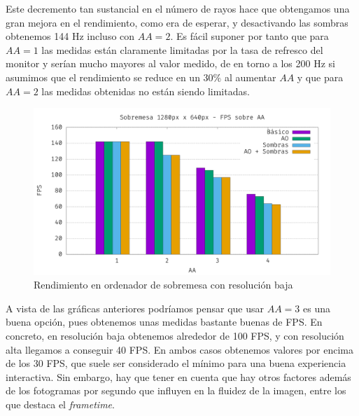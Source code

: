 Este decremento tan sustancial en el número de rayos hace que obtengamos una gran mejora en el rendimiento, como era de esperar, y desactivando las sombras obtenemos 144 Hz incluso con $AA=2$. Es fácil suponer por tanto que para $AA=1$ las medidas están claramente limitadas por la tasa de refresco del monitor y serían mucho mayores al valor medido, de en torno a los 200 Hz si asumimos que el rendimiento se reduce en un $30\%$ al aumentar $AA$ y que para $AA=2$ las medidas obtenidas no están siendo limitadas.\newline
\begin{figure}[ht!]
    \centering
    \includegraphics[width=\textwidth]{Plantilla-TFG-master/img/graficas/SobremesaLR.png}
    \caption{Rendimiento en ordenador de sobremesa con resolución baja}
    \label{fig:sobreLR}
\end{figure}

A vista de las gráficas anteriores podríamos pensar que usar $AA=3$ es una buena opción, pues obtenemos unas medidas bastante buenas de FPS. En concreto, en resolución baja obtenemos alrededor de 100 FPS, y con resolución alta llegamos a conseguir 40 FPS. En ambos casos obtenemos valores por encima de los 30 FPS, que suele ser considerado el mínimo para una buena experiencia interactiva. Sin embargo, hay que tener en cuenta que hay otros factores además de los fotogramas por segundo que influyen en la fluidez de la imagen, entre los que destaca el \textit{frametime}.\newline

